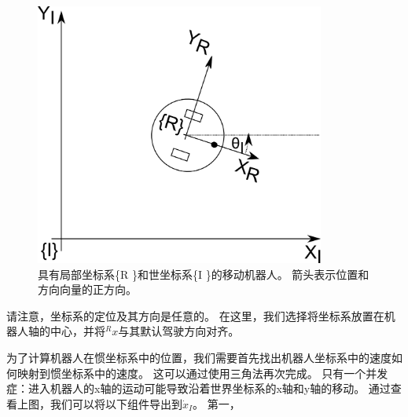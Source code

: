 \begin{figure}[htb!]
	\centering
		\includegraphics[width=0.85\textwidth]{figs/mobilerobot.png}
	\caption{具有局部坐标系\{R \}和世坐标系\{I \}的移动机器人。 箭头表示位置和方向向量的正方向。}
	\label{fig:mobilerobot}
\end{figure}


请注意，坐标系的定位及其方向是任意的。 在这里，我们选择将坐标系放置在机器人轴的中心，并将$ ^ Rx $与其默认驾驶方向对齐。


为了计算机器人在惯坐标系中的位置，我们需要首先找出机器人坐标系中的速度如何映射到惯坐标系中的速度。 这可以通过使用三角法再次完成。 只有一个并发症：进入机器人的x轴的运动可能导致沿着世界坐标系的x轴和y轴的移动。 通过查看上图，我们可以将以下组件导出到$ \dot {x} _I $。 第一，


